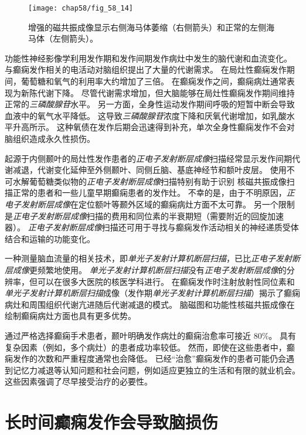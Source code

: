 \begin{figure}[htbp]
	\centering
	\texttt{[image: chap58/fig\_58\_14]}
	\caption{增强的磁共振成像显示右侧海马体萎缩（右侧箭头）和正常的左侧海马体（左侧箭头）。}
	\label{fig:58_14}
\end{figure}


功能性神经影像学利用发作期和发作间期发作病灶中发生的脑代谢和血流变化。
与癫痫发作相关的电活动对脑组织提出了大量的代谢需求。
在局灶性癫痫发作期间，葡萄糖和氧气的利用率大约增加了三倍。
在癫痫发作之间，癫痫病灶通常表现为新陈代谢下降。
尽管代谢需求增加，但大脑能够在局灶性癫痫发作期间维持正常的\textit{三磷酸腺苷}水平。
另一方面，全身性运动发作期间呼吸的短暂中断会导致血液中的氧气水平降低。
这导致\textit{三磷酸腺苷}浓度下降和厌氧代谢增加，如乳酸水平升高所示。
这种氧债在发作后期会迅速得到补充，单次全身性癫痫发作不会对脑组织造成永久性损伤。


起源于内侧颞叶的局灶性发作患者的\textit{正电子发射断层成像}扫描经常显示发作间期代谢减退，代谢变化延伸至外侧颞叶、同侧丘脑、基底神经节和额叶皮层。
使用不可水解葡萄糖类似物的\textit{正电子发射断层成像}扫描特别有助于识别 核磁共振成像扫描正常的患者和一些儿童早期癫痫患者的发作灶。
不幸的是，由于不明原因，\textit{正电子发射断层成像}在定位额叶等颞外区域的癫痫病灶方面不太可靠。
另一个限制是\textit{正电子发射断层成像}扫描的费用和同位素的半衰期短（需要附近的回旋加速器）。
\textit{正电子发射断层成像}扫描还可用于寻找与癫痫发作活动相关的神经递质受体结合和运输的功能变化。


一种测量脑血流量的相关技术，即\textit{单光子发射计算机断层扫描}，已比\textit{正电子发射断层成像}更频繁地使用。
\textit{单光子发射计算机断层扫描}没有\textit{正电子发射断层成像}的分辨率，但可以在很多大医院的核医学科进行。
在癫痫发作时注射放射性同位素和\textit{单光子发射计算机断层扫描}成像（发作期\textit{单光子发射计算机断层扫描}）揭示了癫痫病灶和周围组织代谢亢进随后代谢减退的模式。
脑磁图和功能性核磁共振成像在绘制癫痫病灶方面也具有更多优势。


通过严格选择癫痫手术患者，颞叶明确发作病灶的癫痫治愈率可接近 80\%。
具有复杂因素（例如，多个病灶）的患者成功率较低。
然而，即使在这些患者中，癫痫发作的次数和严重程度通常也会降低。
已经“治愈”癫痫发作的患者可能仍会遇到记忆力减退等认知问题和社会问题，例如适应更独立的生活和有限的就业机会。
这些因素强调了尽早接受治疗的必要性。



\section{长时间癫痫发作会导致脑损伤}


